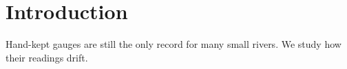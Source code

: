 \begin{abstract}
River gauges kept by hand drift in ways that daily averages hide, and the drift is largest in the weeks after a flood.
\end{abstract}
\section{Introduction}
Hand-kept gauges are still the only record for many small rivers. We study how their readings drift.
